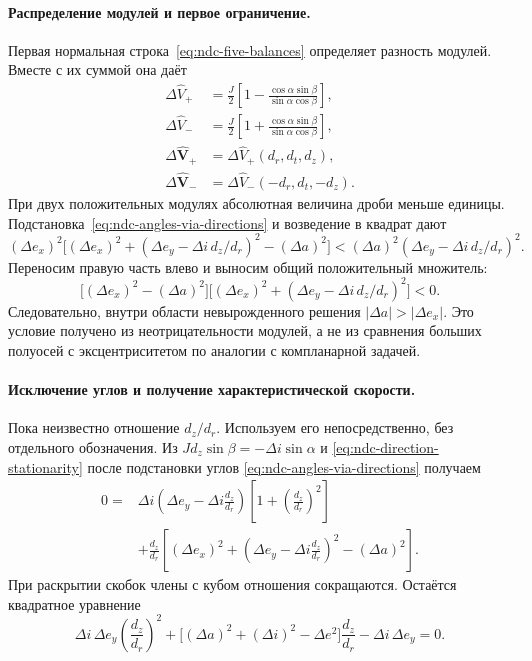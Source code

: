 \paragraph{Распределение модулей и первое ограничение.}
Первая нормальная строка~\eqref{eq:ndc-five-balances} определяет
разность модулей. Вместе с их суммой она даёт
\begin{equation}
\begin{aligned}
 \Delta\widehat V_+&=\frac J2\left[
       1-\frac{\cos\alpha\sin\beta}{\sin\alpha\cos\beta}\right],\\
 \Delta\widehat V_-&=\frac J2\left[
       1+\frac{\cos\alpha\sin\beta}{\sin\alpha\cos\beta}\right],\\
 \Delta\widehat{\boldsymbol V}_+&=\Delta\widehat V_+(d_r,d_t,d_z),\\
 \Delta\widehat{\boldsymbol V}_-&=\Delta\widehat V_-(-d_r,d_t,-d_z).
\end{aligned}
\label{eq:ndc-impulses}
\end{equation}
При двух положительных модулях абсолютная величина дроби меньше
единицы. Подстановка~\eqref{eq:ndc-angles-via-directions}
и возведение в квадрат дают
\[
 (\Delta e_x)^2
 \bigl[(\Delta e_x)^2+(\Delta e_y-\Delta i\,d_z/d_r)^2-(\Delta a)^2\bigr]
 <(\Delta a)^2(\Delta e_y-\Delta i\,d_z/d_r)^2.
\]
Переносим правую часть влево и выносим общий положительный множитель:
\[
 \bigl[(\Delta e_x)^2-(\Delta a)^2\bigr]
 \bigl[(\Delta e_x)^2+(\Delta e_y-\Delta i\,d_z/d_r)^2\bigr]<0.
\]
Следовательно, внутри области невырожденного решения
$|\Delta a|>|\Delta e_x|$. Это условие получено из
неотрицательности модулей, а не из сравнения больших полуосей
с эксцентриситетом по аналогии с компланарной задачей.

\paragraph{Исключение углов и получение характеристической скорости.}
Пока неизвестно отношение $d_z/d_r$. Используем его непосредственно,
без отдельного обозначения. Из
$Jd_z\sin\beta=-\Delta i\sin\alpha$ и
\eqref{eq:ndc-direction-stationarity} после подстановки углов
\eqref{eq:ndc-angles-via-directions} получаем
\[
\begin{aligned}
 0={}&\Delta i\left(\Delta e_y-\Delta i\frac{d_z}{d_r}\right)
                     \left[1+\left(\frac{d_z}{d_r}\right)^2\right]\\
 &+\frac{d_z}{d_r}\left[
 (\Delta e_x)^2+\left(\Delta e_y-\Delta i\frac{d_z}{d_r}\right)^2
                  -(\Delta a)^2\right].
\end{aligned}
\]
При раскрытии скобок члены с кубом отношения сокращаются.
Остаётся квадратное уравнение
\begin{equation}
 \Delta i\,\Delta e_y\left(\frac{d_z}{d_r}\right)^2
 +\bigl[(\Delta a)^2+(\Delta i)^2-\Delta e^2\bigr]\frac{d_z}{d_r}
 -\Delta i\,\Delta e_y=0.
 \label{eq:ndc-direction-quadratic}
\end{equation}

